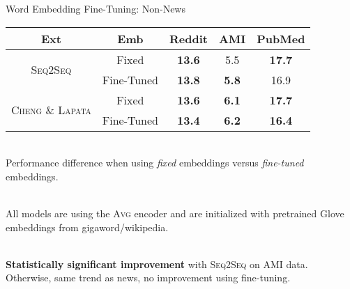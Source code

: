 \begin{frame}{Word Embedding Fine-Tuning: Non-News}
 \begin{center}
  \begin{tabular}{ccccc}
   \toprule
   \textbf{Ext} & \textbf{Emb}  & 
        \textbf{Reddit} & \textbf{AMI} & \textbf{PubMed} \\
   \midrule
   \multirow{2}{*}{\textsc{Seq2Seq}}
      & Fixed & \textbf{13.6} &         5.5  & \textbf{17.7} \\
      & Fine-Tuned & \textbf{13.8} & \textbf{5.8} &         16.9  \\
   \hline
   \multirow{2}{*}{\textsc{Cheng \& Lapata}} 
      & Fixed & \textbf{13.6} & \textbf{6.1} & \textbf{17.7} \\
      & Fine-Tuned & \textbf{13.4} & \textbf{6.2} & \textbf{16.4} \\
   \bottomrule
  \end{tabular}
 \end{center}

 ~\\
 
 Performance difference when using \textit{fixed} embeddings versus 
 \textit{fine-tuned} embeddings.
 
 ~\\

 All models are using the \textsc{Avg} encoder and are initialized with 
 pretrained Glove embeddings from gigaword/wikipedia. 

 ~\\
 \textbf{Statistically significant improvement} with \textsc{Seq2Seq} on AMI
 data.\\
 Otherwise, same trend as news, no improvement using fine-tuning.

\end{frame}

